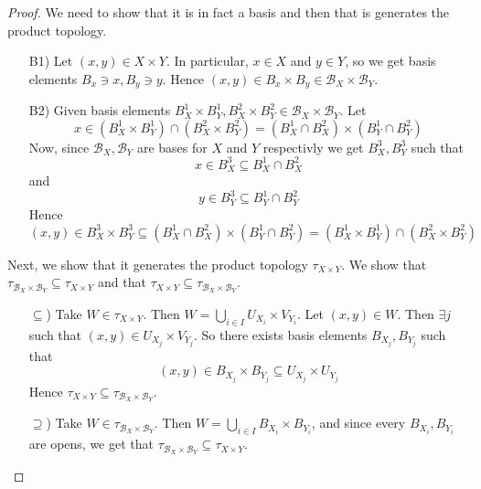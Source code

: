 \begin{proof}
  We need to show that it is in fact a basis
  and then that is generates the product topology.
  \begin{enumerate}
      \item[B1)]
  Let \( (x, y) \in X \times Y \). In particular,
  \( x \in X \) and \( y \in Y \), so we get
  basis elements \( B_x \ni x, B_y \ni y \).
  Hence \( (x, y) \in B_x \times B_y \in \mathscr{B}_X \times \mathscr{B}_Y \).

  \item[B2)] Given basis elements
  \( B_{X}^1 \times B_{Y}^1, B_{X}^2 \times B_{Y}^2 \in
  \mathscr{B}_X \times \mathscr{B}_Y\).
  Let
  \[
    x \in (B_{X}^1 \times B_{Y}^1) \cap (B_{X}^2 \times B_{Y}^2) = 
(B_{X}^1 \cap B_X^2) \times (B_{Y}^1 \cap B_{Y}^2)
  \]
  Now, since \( \mathscr{B}_X, \mathscr{B}_Y \)
  are bases for \( X \) and \( Y \) respectivly
  we get \( B_X^3, B_Y^3 \) such that
  \[
    x \in B_X^3 \subseteq B_X^1 \cap B_X^2
  \]
  and
  \[
    y \in B_Y^3 \subseteq B_Y^1 \cap B_Y^2
  \]
  Hence
  \[
    (x, y) \in B_X^3 \times B_Y^3 \subseteq (B_X^1 \cap B_X^2) \times (B_Y^1 \cap B_Y^2) = 
  (B_{X}^1 \times B_{Y}^1) \cap (B_{X}^2 \times B_{Y}^2)
  \]
  \end{enumerate}

  Next, we show that it generates the product topology
  \( \tau_{X \times Y} \). We show that \( \tau_{\mathscr{B}_X \times \mathscr{B}_Y} \subseteq \tau_{X \times Y} \)
  and that 
\( \tau_{X \times Y} \subseteq \tau_{\mathscr{B}_X \times \mathscr{B}_Y} \).

  \begin{enumerate}
      \item[\( \subseteq \))]
        Take \( W \in \tau_{X \times Y} \).
        Then \( W = \bigcup_{i \in I} U_{X_i} \times V_{Y_i} \).
        Let \( (x, y) \in W \). Then \( \exists j \)
        such that \( (x, y) \in U_{X_j} \times V_{Y_j} \).
      So there exists basis elements \( B_{X_j},B_{Y_j} \)
      such that
      \[
        (x,y) \in B_{X_j} \times B_{Y_j} \subseteq U_{X_j} \times U_{Y_j}
      \]
      Hence \( \tau_{X \times Y} \subseteq \tau_{\mathscr{B}_X \times \mathscr{B}_Y}  \).
      \item[\( \supseteq \))]
        Take \( W \in \tau_{\mathscr{B}_X \times \mathscr{B}_Y} \). Then \( W = \bigcup_{i\in I} B_{X_i} \times B_{Y_i}  \), and since every \( B_{X_i}, B_{Y_i} \) are opens, we get
        that \( \tau_{\mathscr{B}_X \times \mathscr{B}_Y} \subseteq \tau_{X \times Y} \).
  \end{enumerate}
\end{proof}

